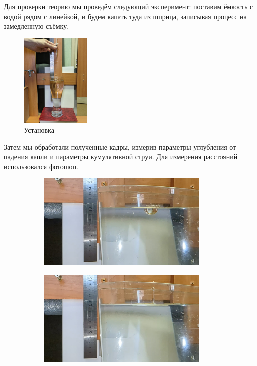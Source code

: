 \documentclass[a4paper, 12pt]{article}
\begin{document}
Для проверки теорию мы проведём следующий эксперимент:
поставим ёмкость с водой рядом с линейкой, и будем капать туда из шприца,
записывая процесс на замедленную съёмку.

\begin{figure}[H]
    \centering
    \includegraphics[width=0.3\textwidth]{img/Установка.jpg}
    \caption*{Установка}
\end{figure}

Затем мы обработали полученные кадры, измерив параметры углубления от
падения капли и параметры кумулятивной струи. Для измерения расстояний
использовался фотошоп.

\begin{figure}[H]
    \begin{subfigure}{0.5\textwidth}
        \includegraphics[width=0.9\textwidth]{img/Experiment data/Jug/39_8/jug 39_8.11.jpg}
    \end{subfigure}%
    \begin{subfigure}{0.5\textwidth}
        \includegraphics[width=0.9\textwidth]{img/Experiment data/Jug/39_8/jug 39_8.12.jpg}
    \end{subfigure}
\end{figure}
\end{document}
